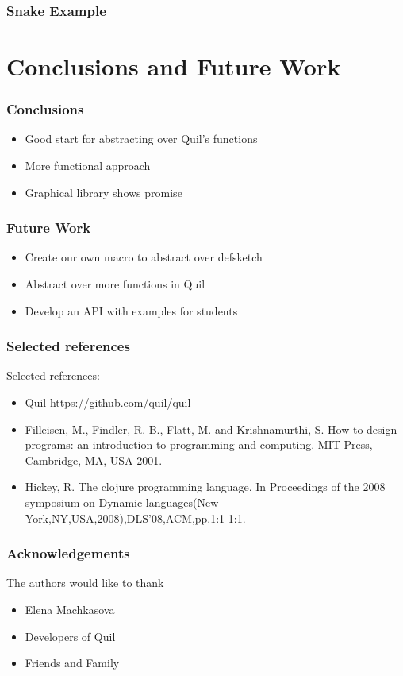 \documentclass{beamer}
\begin{document}
\begin{frame}
\frametitle{Snake Example}
\begin{center}
\end{center}
\end{frame}


\section{Conclusions and Future Work}

\begin{frame}
\frametitle{Conclusions}
\begin{itemize}
\item Good start for abstracting over Quil's functions
\item More functional approach
\item Graphical library shows promise
\end{itemize}
\end{frame}

\begin{frame}
\frametitle{Future Work}
\begin{itemize}
\item Create our own macro to abstract over defsketch
\item Abstract over more functions in Quil
\item Develop an API with examples for students
\end{itemize}
\end{frame}

\begin{frame}
\frametitle{Selected references}
Selected references:
\begin{itemize}
\item Quil https://github.com/quil/quil
\item Filleisen, M., Findler, R. B., Flatt, M. and Krishnamurthi, S. How to design programs: an introduction to programming and computing. MIT Press, Cambridge, MA, USA 2001.
\item Hickey, R. The clojure programming language. In Proceedings of the 2008 symposium on Dynamic languages(New York,NY,USA,2008),DLS'08,ACM,pp.1:1-1:1.
\end{itemize}
\end{frame}

\begin{frame}
\frametitle{Acknowledgements}
The authors would like to thank
\begin{itemize}
\item Elena Machkasova
\item Developers of Quil
\item Friends and Family
\end{itemize}
\end{frame}
\end{document}
